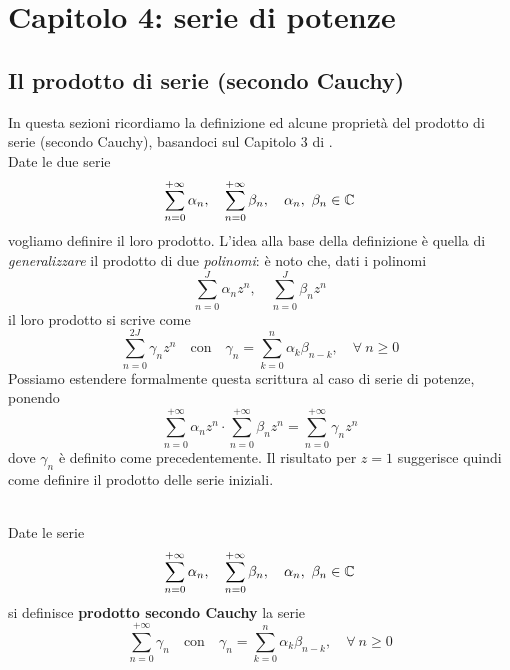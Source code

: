 \section{Capitolo 4: serie di potenze}
\subsection{Il prodotto di serie (secondo Cauchy)}\label{prodottosecondocauchy}
In questa sezioni ricordiamo la definizione ed alcune proprietà del prodotto di serie (secondo Cauchy), basandoci sul Capitolo 3 di \cite{rudin:1976principles}.\\
Date le due serie
\begin{equation*}
	\sum_{n=0}^{+\infty} \alpha_n,\quad \sum_{n=0}^{+\infty} \beta_n,\quad \alpha_n, \ \beta_n \in \mathbb{C}
\end{equation*}
vogliamo definire il loro prodotto. L'idea alla base della definizione è quella di \textit{generalizzare} il prodotto di due \textit{polinomi}: è noto che, dati i polinomi 
\begin{equation*}
	\sum_{n=0}^{J} \alpha_n z^n,\quad \sum_{n=0}^{J} \beta_n z^n
\end{equation*}
il loro prodotto si scrive come
\begin{equation*}
	\sum_{n=0}^{2J} \gamma_n z^n\quad\text{con}\quad\gamma_n= \sum_{k=0}^{n} \alpha_k\beta_{n-k},\quad \forall \ n\geq 0
\end{equation*}
Possiamo estendere formalmente questa scrittura al caso di serie di potenze, ponendo
\begin{equation*}
	\sum_{n=0}^{+\infty} \alpha_n z^n \cdot \sum_{n=0}^{+\infty} \beta_n z^n = \sum_{n=0}^{+\infty} \gamma_n z^n
\end{equation*}
dove $\gamma_n$ è definito come precedentemente. Il risultato per $z=1$ suggerisce quindi come definire il prodotto delle serie iniziali.
\begin{define}~{}\\
	Date le serie
	\begin{equation*}
		\sum_{n=0}^{+\infty} \alpha_n,\quad \sum_{n=0}^{+\infty} \beta_n,\quad \alpha_n, \ \beta_n \in \mathbb{C}
	\end{equation*}
si definisce \textbf{prodotto secondo Cauchy} la serie
\begin{equation*}
	\sum_{n=0}^{+\infty} \gamma_n\quad\text{con}\quad\gamma_n= \sum_{k=0}^{n} \alpha_k\beta_{n-k},\quad \forall \ n\geq 0
\end{equation*}
\end{define}
